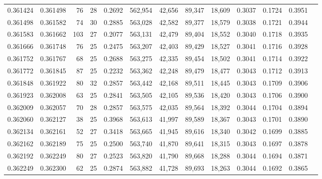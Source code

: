 \begin{tabular}{rrrrrrrrrrrrr}
0.361424 & 0.361498 &    76 &  28 &                                     0.2692 & 562,954 &  42,656 &  89,347 &  18,609 & 0.3037 & 0.1724 & 0.3951 \\
0.361498 & 0.361582 &    74 &  30 &                                     0.2885 & 563,028 &  42,582 &  89,377 &  18,579 & 0.3038 & 0.1721 & 0.3944 \\
0.361583 & 0.361662 &   103 &  27 &                                     0.2077 & 563,131 &  42,479 &  89,404 &  18,552 & 0.3040 & 0.1718 & 0.3935 \\
0.361666 & 0.361748 &    76 &  25 &                                     0.2475 & 563,207 &  42,403 &  89,429 &  18,527 & 0.3041 & 0.1716 & 0.3928 \\
0.361752 & 0.361767 &    68 &  25 &                                     0.2688 & 563,275 &  42,335 &  89,454 &  18,502 & 0.3041 & 0.1714 & 0.3922 \\
0.361772 & 0.361845 &    87 &  25 &                                     0.2232 & 563,362 &  42,248 &  89,479 &  18,477 & 0.3043 & 0.1712 & 0.3913 \\
0.361848 & 0.361922 &    80 &  32 &                                     0.2857 & 563,442 &  42,168 &  89,511 &  18,445 & 0.3043 & 0.1709 & 0.3906 \\
0.361923 & 0.362008 &    63 &  25 &                                     0.2841 & 563,505 &  42,105 &  89,536 &  18,420 & 0.3043 & 0.1706 & 0.3900 \\
0.362009 & 0.362057 &    70 &  28 &                                     0.2857 & 563,575 &  42,035 &  89,564 &  18,392 & 0.3044 & 0.1704 & 0.3894 \\
0.362060 & 0.362127 &    38 &  25 &                                     0.3968 & 563,613 &  41,997 &  89,589 &  18,367 & 0.3043 & 0.1701 & 0.3890 \\
0.362134 & 0.362161 &    52 &  27 &                                     0.3418 & 563,665 &  41,945 &  89,616 &  18,340 & 0.3042 & 0.1699 & 0.3885 \\
0.362162 & 0.362189 &    75 &  25 &                                     0.2500 & 563,740 &  41,870 &  89,641 &  18,315 & 0.3043 & 0.1697 & 0.3878 \\
0.362192 & 0.362249 &    80 &  27 &                                     0.2523 & 563,820 &  41,790 &  89,668 &  18,288 & 0.3044 & 0.1694 & 0.3871 \\
0.362249 & 0.362300 &    62 &  25 &                                     0.2874 & 563,882 &  41,728 &  89,693 &  18,263 & 0.3044 & 0.1692 & 0.3865 \\

\end{tabular}
